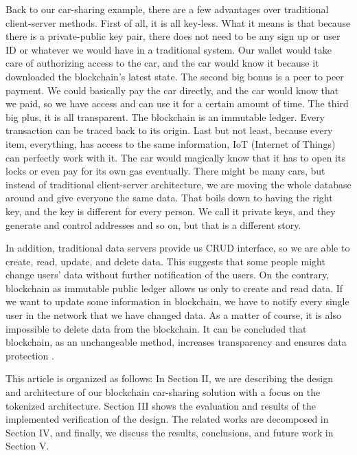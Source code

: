 Back to our car-sharing example, there are a few advantages over traditional client-server methods. First of all, it is all key-less. What it means is that because there is a private-public key pair, there does not need to be any sign up or user ID or whatever we would have in a traditional system. Our wallet would take care of authorizing access to the car, and the car would know it because it downloaded the blockchain's latest state. The second big bonus is a peer to peer payment. We could basically pay the car directly, and the car would know that we paid, so we have access and can use it for a certain amount of time. The third big plus, it is all transparent. The blockchain is an immutable ledger. Every transaction can be traced back to its origin. Last but not least, because every item, everything, has access to the same information, IoT (Internet of Things) can perfectly work with it. The car would magically know that it has to open its locks or even pay for its own gas eventually. There might be many cars, but instead of traditional client-server architecture, we are moving the whole database around and give everyone the same data. That boils down to having the right key, and the key is different for every person. We call it private keys, and they generate and control addresses and so on, but that is a different story. 

In addition, traditional data servers provide us CRUD interface, so we are able to create, read, update, and delete data. This suggests that some people might change users' data without further notification of the users. On the contrary, blockchain as immutable public ledger allows us
only to create and read data. If we want to update some information in blockchain, we have to notify every single user in the network that we have changed data. As a matter of course, it is also impossible to delete data from the blockchain. It can be concluded that blockchain, as an unchangeable method, increases transparency and ensures data protection \cite{xu2016blockchain}.

This article is organized as follows: In Section II, we are describing the design and architecture of our blockchain car-sharing solution with a focus on the tokenized architecture. Section III shows the evaluation and results of the implemented verification of the design. The related works are decomposed in Section IV, and finally, we discuss the results, conclusions, and future work in Section V.
